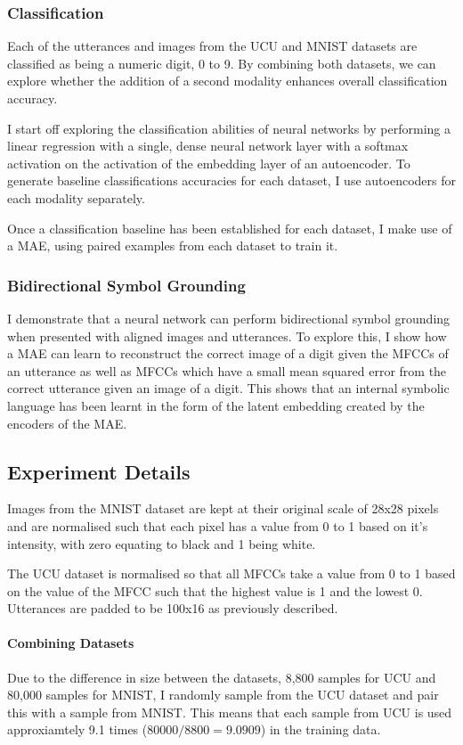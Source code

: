 \subsubsection{Classification}
Each of the utterances and images from the UCU and MNIST datasets are classified as being a numeric digit, 0 to 9. By combining both datasets, we can explore whether the addition of a second modality enhances overall classification accuracy.

I start off exploring the classification abilities of neural networks by performing a linear regression with a single, dense neural network layer with a softmax activation on the activation of the embedding layer of an autoencoder. To generate baseline classifications accuracies for each dataset, I use autoencoders for each modality separately.

Once a classification baseline has been established for each dataset, I make use of a MAE, using paired examples from each dataset to train it.

\subsubsection{Bidirectional Symbol Grounding}

I demonstrate that a neural network can perform bidirectional symbol grounding \cite{barsalou2008grounded} when presented with aligned images and utterances. To explore this, I show how a MAE can learn to reconstruct the correct image of a digit given the MFCCs of an utterance as well as MFCCs which have a small mean squared error from the correct utterance given an image of a digit. This shows that an internal symbolic language has been learnt in the form of the latent embedding created by the encoders of the MAE.


\subsection{Experiment Details}
Images from the MNIST dataset are kept at their original scale of 28x28 pixels and are normalised such that each pixel has a value from 0 to 1 based on it's intensity, with zero equating to black and 1 being white.

The UCU dataset is normalised so that all MFCCs take a value from 0 to 1 based on the value of the MFCC such that the highest value is 1 and the lowest 0. Utterances are padded to be 100x16 as previously described.

\paragraph{Combining Datasets}
\label{sec:UCU_mnist_comb}
Due to the difference in size between the datasets, 8,800 samples for UCU and 80,000 samples for MNIST, I randomly sample from the UCU dataset and pair this with a sample from MNIST. This means that each sample from UCU is used approxiamtely 9.1 times ($80000/8800=9.0909$) in the training data.

